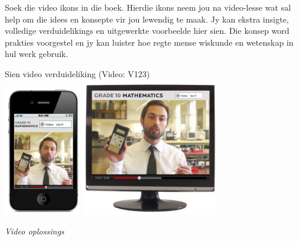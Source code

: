 {

Soek die video ikons in die boek. Hierdie ikons neem jou na video-lesse wat sal help om die idees en konsepte vir jou lewendig te maak. Jy kan ekstra insigte, volledige verduidelikings en uitgewerkte voorbeelde hier sien. Die konsep word prakties voorgestel en jy kan luister hoe regte mense wiskunde en wetenskap in hul werk gebruik. \par

\begin{center}
Sien video verduideliking  (Video: V123)\\

\includegraphics[width=0.25\textwidth]{title_images/Iphonevideo.png}
\hspace{1cm}
\includegraphics[width=0.45\textwidth]{title_images/PCscreenvideom.png}
\end{center}\par

}
{\normalfont\sffamily\fontsize{22}\normalfont\itshape Video oplossings} \par

